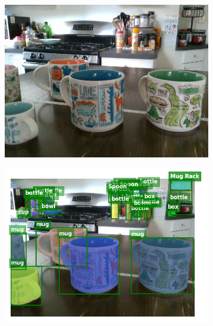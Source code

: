\documentclass{article}
\begin{document}
\begin{figure}[]
    \centering

    \begin{subfigure}{(\linewidth - 0.05\linewidth)/5}
        \centering
        \includegraphics[width=\linewidth]{figures/real2sim2real/6/1.png}
    \end{subfigure}
    \begin{subfigure}{(\linewidth - 0.05\linewidth)/5}
        \centering
        \includegraphics[width=\linewidth]{figures/real2sim2real/6/0.png}
    \end{subfigure}
    \begin{subfigure}{(\linewidth - 0.05\linewidth)/5}
        \centering

\end{subfigure}
\end{figure}
\end{document}
